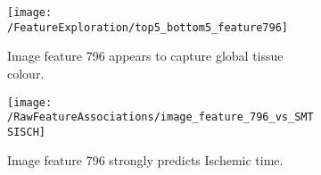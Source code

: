 \documentclass{article}
\begin{document}



\begin{figure}[h]
\begin{subfigure}{0.65\textwidth}
    \centering
    \texttt{[image: /FeatureExploration/top5\_bottom5\_feature796]}
    \caption{Image feature 796 appears to capture global tissue colour.}
    \label{fig:top5_bottom5_feature796}
\end{subfigure}
\begin{subfigure}{0.3\textwidth}
    \centering
    \texttt{[image: /RawFeatureAssociations/image\_feature\_796\_vs\_SMTSISCH]}
    \caption{Image feature 796 strongly predicts Ischemic time.}
    \label{fig:image_feature_796_vs_SMTSISCH}
 \end{subfigure}
 \caption{}
\end{figure}

\end{document}
